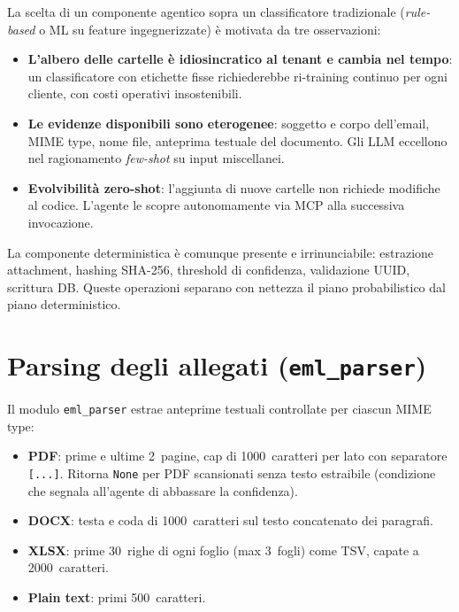 La scelta di un componente agentico sopra un classificatore tradizionale
(\emph{rule-based} o ML su feature ingegnerizzate) \`e motivata da tre osservazioni:

\begin{itemize}[leftmargin=*]
    \item \textbf{L'albero delle cartelle \`e idiosincratico al tenant e cambia nel tempo}:
          un classificatore con etichette fisse richiederebbe ri-training continuo per
          ogni cliente, con costi operativi insostenibili.
    \item \textbf{Le evidenze disponibili sono eterogenee}: soggetto e corpo dell'email,
          MIME type, nome file, anteprima testuale del documento. Gli LLM eccellono
          nel ragionamento \emph{few-shot} su input miscellanei.
    \item \textbf{Evolvibilit\`a zero-shot}: l'aggiunta di nuove cartelle non richiede
          modifiche al codice. L'agente le scopre autonomamente via MCP alla successiva
          invocazione.
\end{itemize}

La componente deterministica \`e comunque presente e irrinunciabile: estrazione
attachment, hashing SHA-256, threshold di confidenza, validazione UUID, scrittura DB.
Queste operazioni separano con nettezza il piano probabilistico dal piano deterministico.

\section{Parsing degli allegati (\texttt{eml\_parser})}
\label{sec:eml_parser}

Il modulo \texttt{eml\_parser} estrae anteprime testuali controllate per ciascun MIME type:

\begin{itemize}[leftmargin=*]
    \item \textbf{PDF}: prime e ultime 2~pagine, cap di 1000~caratteri per lato con
          separatore \texttt{[...]}. Ritorna \texttt{None} per PDF scansionati senza
          testo estraibile (condizione che segnala all'agente di abbassare la confidenza).
    \item \textbf{DOCX}: testa e coda di 1000~caratteri sul testo concatenato dei paragrafi.
    \item \textbf{XLSX}: prime 30~righe di ogni foglio (max 3~fogli) come TSV, capate
          a 2000~caratteri.
    \item \textbf{Plain text}: primi 500~caratteri.
\end{itemize}

